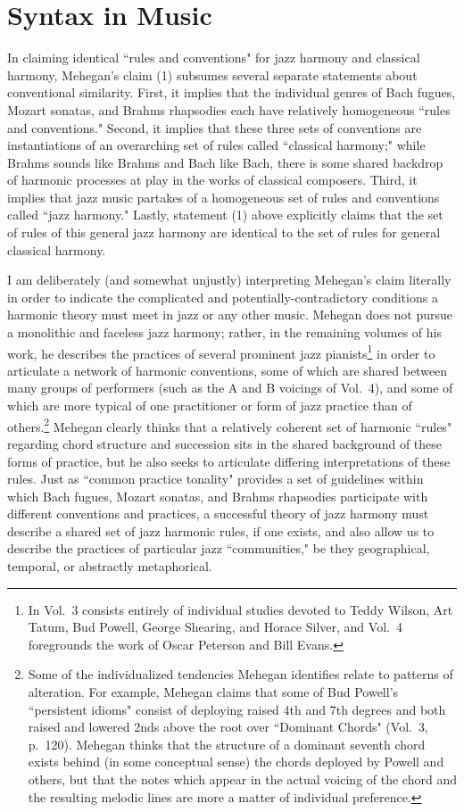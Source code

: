 \section{Syntax in Music}%

In claiming identical ``rules and conventions" for jazz harmony and classical harmony, Mehegan's claim (1) subsumes several separate statements about conventional similarity.  First, it implies that the individual genres of Bach fugues, Mozart sonatas, and Brahms rhapsodies each have relatively homogeneous ``rules and conventions."  Second, it implies that these three sets of conventions are instantiations of an overarching set of rules called ``classical harmony;" while Brahms sounds like Brahms and Bach like Bach, there is some shared backdrop of harmonic processes at play in the works of classical composers.  Third, it implies that jazz music partakes of a homogeneous set of rules and conventions called ``jazz harmony."  Lastly, statement (1) above explicitly claims that the set of rules of this general jazz harmony are identical to the set of rules for general classical harmony.

I am deliberately (and somewhat unjustly) interpreting Mehegan's claim literally in order to indicate the complicated and potentially-contradictory conditions a harmonic theory must meet in jazz or any other music.  Mehegan does not pursue a monolithic and faceless jazz harmony; rather, in the remaining volumes of his work, he describes the practices of several prominent jazz pianists\footnote{In Vol.\ 3 consists entirely of individual studies devoted to Teddy Wilson, Art Tatum, Bud Powell, George Shearing, and Horace Silver, and Vol.\ 4 foregrounds the work of Oscar Peterson and Bill Evans.} in order to articulate a network of harmonic conventions, some of which are shared between many groups of performers (such as the A and B voicings of Vol.\ 4), and some of which are more typical of one practitioner or form of jazz practice than of others.\footnote{Some of the individualized tendencies Mehegan identifies relate to patterns of alteration.  For example, Mehegan claims that some of Bud Powell's ``persistent idioms" consist of deploying raised 4th and 7th degrees and both raised and lowered 2nds above the root over ``Dominant Chords" (Vol.\ 3, p.\ 120).  Mehegan thinks that the structure of a dominant seventh chord exists behind (in some conceptual sense) the chords deployed by Powell and others, but that the notes which appear in the actual voicing of the chord and the resulting melodic lines are more a matter of individual preference.}  Mehegan clearly thinks that a relatively coherent set of harmonic ``rules" regarding chord structure and succession sits in the shared background of these forms of practice, but he also seeks to articulate differing interpretations of these rules.  Just as ``common practice tonality" provides a set of guidelines within which Bach fugues, Mozart sonatas, and Brahms rhapsodies participate with different conventions and practices, a successful theory of jazz harmony must describe a shared set of jazz harmonic rules, if one exists, and also allow us to describe the practices of particular jazz ``communities," be they geographical, temporal, or abstractly metaphorical.

